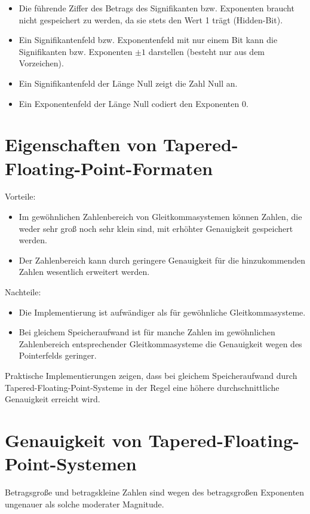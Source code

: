 \documentclass[10pt]{article}
\begin{document}
\begin{itemize}
  \item Die führende Ziffer des Betrags des Signifikanten bzw. Exponenten braucht nicht gespeichert zu werden, da sie stets den Wert 1 trägt (Hidden-Bit).
  \item Ein Signifikantenfeld bzw. Exponentenfeld mit nur einem Bit kann die Signifikanten bzw. Exponenten $\pm 1$ darstellen (besteht nur aus dem Vorzeichen).
  \item Ein Signifikantenfeld der Länge Null zeigt die Zahl Null an.
  \item Ein Exponentenfeld der Länge Null codiert den Exponenten 0.
\end{itemize}

\section*{Eigenschaften von Tapered-Floating-Point-Formaten}
Vorteile:

\begin{itemize}
  \item Im gewöhnlichen Zahlenbereich von Gleitkommasystemen können Zahlen, die weder sehr groß noch sehr klein sind, mit erhöhter Genauigkeit gespeichert werden.
  \item Der Zahlenbereich kann durch geringere Genauigkeit für die hinzukommenden Zahlen wesentlich erweitert werden.
\end{itemize}

Nachteile:

\begin{itemize}
  \item Die Implementierung ist aufwändiger als für gewöhnliche Gleitkommasysteme.
  \item Bei gleichem Speicheraufwand ist für manche Zahlen im gewöhnlichen Zahlenbereich entsprechender Gleitkommasysteme die Genauigkeit wegen des Pointerfelds geringer.
\end{itemize}

Praktische Implementierungen zeigen, dass bei gleichem Speicheraufwand durch Tapered-Floating-Point-Systeme in der Regel eine höhere durchschnittliche Genauigkeit erreicht wird.

\section*{Genauigkeit von Tapered-Floating-Point-Systemen}
Betragsgroße und betragskleine Zahlen sind wegen des betragsgroßen Exponenten ungenauer als solche moderater Magnitude.
\end{document}
